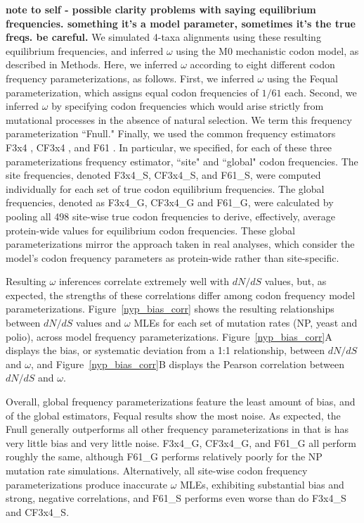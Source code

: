 \documentclass[11pt]{article}
\begin{document}
\textbf{note to self - possible clarity problems with saying equilibrium frequencies. something it's a model parameter, sometimes it's the true freqs. be careful.}
We simulated 4-taxa alignments using these resulting equilibrium frequencies, and inferred $\omega$ using the M0 mechanistic codon model, as described in Methods. Here, we inferred $\omega$ according to eight different codon frequency parameterizations, as follows. First, we inferred $\omega$ using the Fequal \cite{Yang2006} parameterization, which assigns equal codon frequencies of $1/61$ each. Second, we inferred $\omega$ by specifying codon frequencies which would arise strictly from mutational processes in the absence of natural selection. We term this frequency parameterization ``Fnull." Finally, we used the common frequency estimators F3x4 \cite{MuseGaut1994}, CF3x4 \cite{Pond2010}, and F61 \cite{GoldmanYang1994}. In particular, we specified, for each of these three parameterizations frequency estimator, ``site" and ``global" codon frequencies. The site frequencies, denoted F3x4\_S, CF3x4\_S, and F61\_S, were computed individually for each set of true codon equilibrium frequencies. The global frequencies, denoted as F3x4\_G, CF3x4\_G and F61\_G, were calculated by pooling all 498 site-wise true codon frequencies to derive, effectively, average protein-wide values for equilibrium codon frequencies. These global parameterizations mirror the approach taken in real analyses, which consider the model's codon frequency parameters as protein-wide rather than site-specific. 

Resulting $\omega$ inferences correlate extremely well with $dN/dS$ values, but, as expected, the strengths of these correlations differ among codon frequency model parameterizations. Figure~\ref{nyp_bias_corr} shows the resulting relationships between $dN/dS$ values and $\omega$ MLEs for each set of mutation rates (NP, yeast and polio), across model frequency parameterizations. Figure~\ref{nyp_bias_corr}A displays the bias, or systematic deviation from a 1:1 relationship, between $dN/dS$ and $\omega$, and Figure~\ref{nyp_bias_corr}B displays the Pearson correlation between $dN/dS$ and $\omega$.

Overall, global frequency parameterizations feature the least amount of bias, and of the global estimators, Fequal results show the most noise. As expected, the Fnull generally outperforms all other frequency parameterizations in that is has very little bias and very little noise. F3x4\_G, CF3x4\_G, and F61\_G all perform roughly the same, although F61\_G performs relatively poorly for the NP mutation rate simulations. Alternatively, all site-wise codon frequency parameterizations produce inaccurate $\omega$ MLEs, exhibiting substantial bias and strong, negative correlations, and F61\_S performs even worse than do F3x4\_S and CF3x4\_S. 
\end{document}
